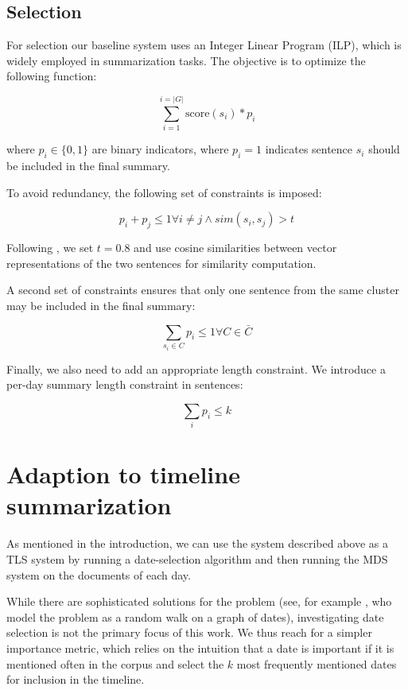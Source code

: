 \documentclass[a4paper,BCOR=10mm]{report}
\begin{document}
\subsection{Selection}

For selection our baseline system uses an Integer Linear Program (ILP), which is widely employed in summarization tasks.
The objective is to optimize the following function:

\begin{displaymath}
\sum_{i = 1}^{i = |G|} \text{score}(s_i) * p_i
\end{displaymath}

where $p_i \in \{0, 1\}$ are binary indicators, where $p_i = 1$ indicates sentence $s_i$ should be included in the final summary.

To avoid redundancy, the following set of constraints is imposed:

\begin{displaymath}
p_i + p_{j} \leq 1 \forall i \neq j \land sim(s_i, s_j) > t
\end{displaymath}

Following \citet{banerjee}, we set $t = 0.8$ and use cosine similarities between vector representations of the two sentences for similarity computation.

A second set of constraints ensures that only one sentence from the same cluster may be included in the final summary:

\begin{displaymath}
\sum_{s_i \in C} p_i \leq 1 \forall C \in \bar{C}
\end{displaymath}

Finally, we also need to add an appropriate length constraint. We introduce a per-day summary length constraint in sentences:

\begin{displaymath}
\sum_{i} p_i \leq k
\end{displaymath}


\section{Adaption to timeline summarization}

As mentioned in the introduction, we can use the system described above as a TLS system by running a date-selection algorithm and then running the MDS system on the documents of each day.

While there are sophisticated solutions for the problem (see, for example \citet{tran-datesel}, who model the problem as a random walk on a graph of dates), investigating date selection is not the primary focus of this work.
We thus reach for a simpler importance metric, which relies on the intuition that a date is important if it is mentioned often in the corpus and select the $k$ most frequently mentioned dates for inclusion in the timeline.
\end{document}
